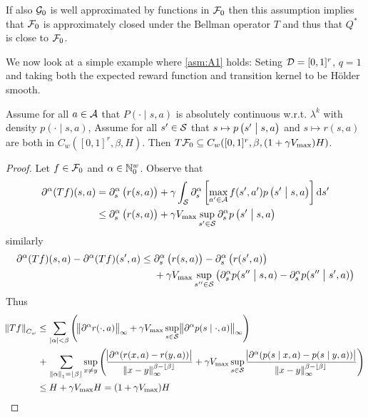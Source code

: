If also $\mathcal{G}_0$ is well approximated by functions in $\mathcal{F}_0$
then this assumption implies that $\mathcal{F}_0$ is approximately closed
under the Bellman operator $T$ and thus that $Q^*$ is close to $\mathcal{F}_0$.

We now look at a simple example where \cref{asm:A1} holds:
Seting $\mathcal{D}=[0,1]^r$, $q=1$ 
and taking both the expected reward function and transition kernel
to be Hölder smooth.

\begin{prop}
  Assume for all $a \in \mathcal{A}$ that
  $P(\cdot \mid s,a)$ is absolutely continuous w.r.t. $\lambda^k$
  with density $p(\cdot \mid s, a)$,
  Assume for all $s' \in \mathcal{S}$ that
  $s \mapsto p\left(s' \;\middle\vert\; s, a \right)$
  and $s \mapsto r(s, a)$
  are both in $C_w([0,1]^r, \beta, H)$.
  Then $T \mathcal{F}_0 \subseteq C_w([0,1]^r, \beta, (1 + \gamma V_{\max}) H)$.
\end{prop}
\begin{proof}
  Let $f \in \mathcal{F}_0$ and $\alpha \in \mathbb{N}_0^w$.
  Observe that
  \begin{align*}
    \partial^\alpha (Tf)(s, a)
    = & \; \partial^\alpha_s \left( r(s, a) \right)
    + \gamma \int_{\mathcal{S}}\partial^\alpha_s \left[ \max_{a' \in \mathcal{A}}
    f(s', a') p\left(s' \;\middle\vert\; s, a\right) \right] \mathrm{d} s' 
    \\ \leq & \; \partial^\alpha_s \left( r(s, a) \right)
    + \gamma V_{\max} \sup_{s' \in \mathcal{S}} \partial_s^\alpha
    p\left(s' \;\middle\vert\; s, a\right)
  \end{align*}
  similarly
  \begin{align*}
    \partial^\alpha (Tf)(s, a) - \partial^\alpha (Tf)(s', a)
    \leq & \; \partial^\alpha_s \left( r(s, a) \right)
    - \partial^\alpha_s \left( r(s', a) \right)
    \\ & \; + \gamma V_{\max} \sup_{s'' \in \mathcal{S}}
    \left( \partial_s^\alpha p(s'' \;\middle\vert\; s, a)
    - \partial_s^\alpha p(s'' \;\middle\vert\; s', a) \right)
  \end{align*}
  Thus
  \begin{align*}
    \norm{Tf}_{C_w} \leq & \; \sum_{\abs{\alpha}<\beta} \left(
      \norm{\partial^\alpha r(\cdot, a)}_\infty
      + \gamma V_{\max} \sup_{s \in \mathcal{S}} \norm{\partial^\alpha
    p(s \mid \cdot, a)}_\infty \right)
    \\ + & \; \sum_{\norm{\alpha}_1 = \lfloor\beta\rfloor} \sup_{x \neq y}
    \left(
      \frac{\abs{\partial^\alpha (r(x, a) - r(y, a))}}
      {\norm{x - y}_{\infty}^{\beta - \lfloor\beta\rfloor}}
      + \gamma V_{\max} \sup_{s \in \mathcal{S}} \frac{
      \abs{\partial^\alpha (p(s \mid x, a) - p(s \mid y, a))}}
      {\norm{x - y}_{\infty}^{\beta - \lfloor\beta\rfloor}}
    \right)
    \\ \leq & \; H + \gamma V_{\max} H = (1 + \gamma V_{\max}) H
  \end{align*}
  
\end{proof}


